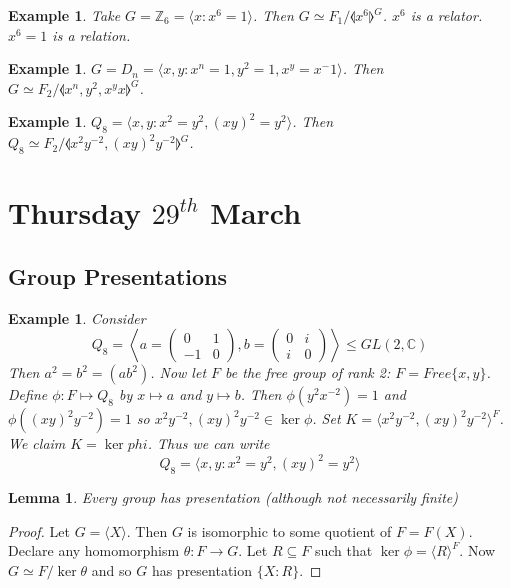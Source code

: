 \documentclass[a4paper,10pt]{article}
\newcommand{\CC}{\mathbb{C}}
\newcommand{\ZZ}{\mathbb{Z}}
\newtheorem{eg}[thm]{Example}
\newtheorem{Lem}[thm]{Lemma}
\begin{document}
\begin{eg}
Take $G = \ZZ_6 = \langle x : x^6 = 1\rangle$. Then $G \simeq F_1 / \llangle x^6 \rrangle^G$. $x^6$ is a relator. $x^6 = 1$ is a relation.
\end{eg}

\begin{eg}
$G = D_n = \langle x,y : x^n = 1, y^2 = 1, x^y = x^-1 \rangle$. Then $G \simeq F_2 / \llangle x^n, y^2, x^y x \rrangle^G$.
\end{eg}

\begin{eg}
$Q_8 = \langle x,y : x^2 = y^2, (xy)^2 = y^2 \rangle$. Then $Q_8 \simeq F_2 / \llangle x^2y^{-2}, (xy)^2y^{-2} \rrangle^G$. 
\end{eg}





\newpage
\section{Thursday $29^{th}$ March}

\subsection{Group Presentations}
\begin{eg}
Consider 
\[ Q_8 = \left\langle a = \begin{pmatrix} 0 & 1 \\ -1 & 0 \end{pmatrix}, b = \begin{pmatrix} 0 & i \\ i & 0 \end{pmatrix} \right\rangle \leq GL(2,\CC) \]
Then $a^2 = b^2 = (ab^2)$. Now let $F$ be the free group of rank 2: $F = Free\{ x, y\}$. Define $\phi: F \mapsto Q_8$ by $x \mapsto a$ and $y \mapsto b$. Then $\phi( y^2x^{-2}) = 1$ and $\phi( (xy)^2y^{-2}) = 1$ so $x^2y^{-2}, (xy)^2y^{-2} \in \ker \phi$. Set $K = \langle x^2y^{-2}, (xy)^2y^{-2} \rangle^F$. We claim $K = \ker phi$. Thus we can write 
\[ Q_8 = \langle x,y : x^2 = y^2, (xy)^2 = y^2 \rangle \]
\end{eg}

\begin{Lem}
Every group has presentation (although not necessarily finite) 
\end{Lem}

\begin{proof}
Let $G = \langle X \rangle$. Then $G$ is isomorphic to some quotient of $F = F(X)$. Declare any homomorphism $\theta : F \rightarrow G$. Let $R \subseteq F$ such that $\ker \phi = \langle R \rangle^F$. Now $G \simeq F / \ker \theta$ and so $G$ has presentation $\{ X : R \}$. 
\end{proof}
\end{document}
